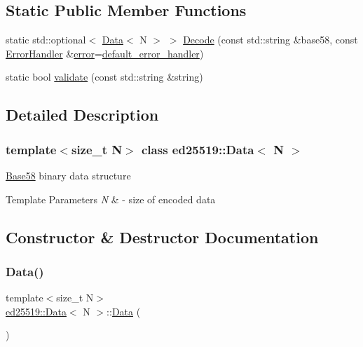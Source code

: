 \subsection*{Static Public Member Functions}
\begin{DoxyCompactItemize}
\item 
static std\+::optional$<$ \mbox{\hyperlink{classed25519_1_1_data}{Data}}$<$ N $>$ $>$ \mbox{\hyperlink{classed25519_1_1_data_a289015b1f2c8c57fed156d0f18059968}{Decode}} (const std\+::string \&base58, const \mbox{\hyperlink{namespaceed25519_a6ba572942b3c18591fc869d52a6b16e6}{Error\+Handler}} \&\mbox{\hyperlink{namespaceed25519_ac93d0b5156eaca22197055e902920bc4}{error}}=\mbox{\hyperlink{namespaceed25519_a7c7bb6ed17541162959c33ed3e3b15fb}{default\+\_\+error\+\_\+handler}})
\item 
static bool \mbox{\hyperlink{classed25519_1_1_data_ade9c93cb08f9d60aa45e75821ed1bcbe}{validate}} (const std\+::string \&string)
\end{DoxyCompactItemize}


\subsection{Detailed Description}
\subsubsection*{template$<$size\+\_\+t N$>$\newline
class ed25519\+::\+Data$<$ N $>$}

\mbox{\hyperlink{classed25519_1_1_base58}{Base58}} binary data structure 
\begin{DoxyTemplParams}{Template Parameters}
{\em N} & -\/ size of encoded data \\
\hline
\end{DoxyTemplParams}


\subsection{Constructor \& Destructor Documentation}
\mbox{\label{classed25519_1_1_data_a2c637587095d6527cd4136926fb8b452}} 
\subsubsection{\texorpdfstring{Data()}{Data()}}
{\footnotesize\ttfamily template$<$size\+\_\+t N$>$ \\
\mbox{\hyperlink{classed25519_1_1_data}{ed25519\+::\+Data}}$<$ N $>$\+::\mbox{\hyperlink{classed25519_1_1_data}{Data}} (\begin{DoxyParamCaption}{ }\end{DoxyParamCaption})\hspace{0.3cm}{\ttfamily [inline]}}



